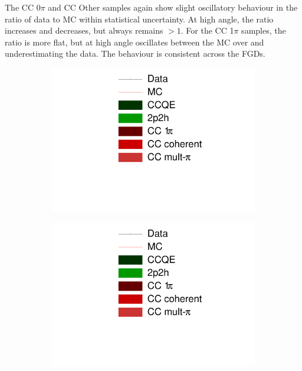 The CC 0$\pi$ and CC Other samples again show slight oscillatory behaviour in the ratio of data to MC within statistical uncertainty. At high angle, the ratio increases and decreases, but always remains $>1$. For the CC 1$\pi$ samples,  the ratio is more flat, but at high angle oscillates between the MC over and underestimating the data. The behaviour is consistent across the FGDs.

\begin{figure}[!h]
\centering
\begin{subfigure}{.24\textwidth}
  \centering
  \includegraphics[width=\linewidth, trim={5mm 60mm 30mm 0mm}, clip]{figs/legend}
\end{subfigure}
\begin{subfigure}{.24\textwidth}
  \centering
  \includegraphics[width=\linewidth, trim={5mm 0mm 30mm 80mm}, clip]{figs/legend}

\end{subfigure}
\end{figure}

